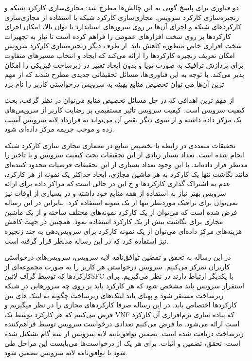 \documentclass{article}
\begin{document}
دو فناوری برای پاسخ گویی به این چالش‌ها مطرح شد: مجازی‌سازی کارکرد شبکه
و زنجیره‌سازی کارکرد سرویس.
مجازی‌سازی کارکرد شبکه با استفاده از مجازی‌سازی کارکردهای شبکه و اجرای آن‌ها بر روی سرورهای استاندارد با توان بالا، امکان اجرای کارکردها
بر روی سخت افزارهای عمومی را فراهم کرده است تا نیاز به تجهیزات سخت افزاری خاص منظوره کاهش یابد.
از طرف دیگر زنجیره‌سازی کارکرد سرویس امکان تعریف زنجیره کارکردها را ارائه می‌کند که ایجاد و انتخاب مسیرهای متفاوت برای پردازش ترافیک
به صورت پویا و بدون ایجاد تغییر در زیرساخت فیزیکی را امکان پذیر می‌کند.
با توجه به این فناوری‌ها، مسائل تحقیقاتی جدیدی مطرح شدند که از مهم ترین آن‌ها می توان تخصیص منابع بهینه به سرویس درخواستی کاربر را نام برد.

از مهم ترین اهدافی که در حل مسائل تخصیص منابع می‌توان در نظر گرفت، بحث کیفیت سرویس است.
کیفیت سرویس تاثیر مستقیمی بر رضایت کاربر از سرویس‌های یک مرکز داده داشته و از سوی دیگر نقص آن می‌تواند به قرارداد لایه سرویس آسیب زده
و موجب جریمه مرکز داده‌ای شود.

تحقیقات متعددی در رابطه با تخصیص منابع در معماری مجازی سازی کارکرد شبکه انجام شده است.
تعداد بسیار زیادی از این تحقیقات بحث کیفیت سرویس و یا تاخیر را مدنظر قرار داده‌اند. با این وجود تعداد بسیاری از این تحقیقات فرضیات محدود کننده‌ای
مانند نگاشت تنها یک کارکرد به هر ماشین مجازی، ایجاد حداکثر یک نمونه از هر کارکرد، عدم به اشتراک گذاری کارکردها و ‌خ
این در حالی است که مراکز داده برای ارائه سرویس بهتر نیاز به استفاده از همه منابع خود داشته و در بسیاری از اوقات نیز نمی‌توان برای ترافیک موردنظر تنها از یک نمونه استفاده کرد.
بنابراین در این رساله فرض شده است که می‌توان از یک کارکرد نمونه‌های مختلف ساخته و از یک ماشین مجازی برای نگاشت بیش از یک کارکرد استفاده نمود.
همچنین در جهت کاهش هزینه‌های مرکز داده‌ای می‌توان از یک نمونه کارکرد برای سرویس‌دهی به چند زنجیره نیز استفاده کرد که در این رساله مدنظر قرار گرفته است.

در این رساله به تحقق و تمضین توافق‌نامه لایه سرویس، سرویس‌های درخواستی کاربران تمرکز می‌کنیم.
سرویس درخواستی هر کاربر را به صورت مجموعه‌ای از کارکردها که توسط گراف ‌لاتین{SFC} با یکدیگر ارتباط دارند در نظر می‌گیریم.
برای استقرار سرویس باید مشخص شود که هر کارکرد باید بر روی چه سرورهایی در شبکه زیرساخت مستقر شود
و پهنای باند لینک‌های زیرساخت چگونه به لینک های بین کارکردها اختصاص یابد.
در این رساله صرفا کارکردهای مجازی را در نظر میگیریم و فرض می‌کنیم که هر کارکرد توسط یک VNF که پیاده سازی نرم‌افزاری آن کارکرد است ارائه می‌شود.
ما فرض می‌کنیم تعدادی درخواست سرویس توسط فراهم‌کننده زیرساخت دریافت شده است. تضمین توافق‌نامه لایه سرویس از سه گام تشکیل شده است: تحقق، تضمین و اثبات.
برای هر یک از درخواست‌ها می‌بایست این مراحل طی شود تا توافق‌نامه لایه سرویس تضمین شود.
\end{document}
